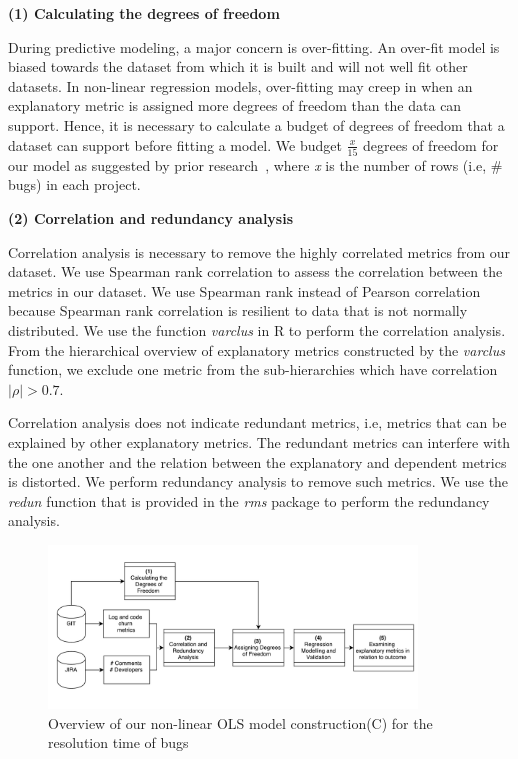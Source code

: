 

\noindent \textbf{(1) Calculating the degrees of freedom}

During predictive modeling, a major concern is over-fitting. An over-fit model is biased towards the dataset from which it is built and will not well fit other datasets. In non-linear regression models, over-fitting may creep in when an explanatory metric is assigned more degrees of freedom than the data can support. Hence, it is necessary to calculate a budget of degrees of freedom that a dataset can support before fitting a model. We budget $\frac{x}{15}$ degrees of freedom for our model as suggested by prior research~\cite{DegreesofFreedom}, where \textsl{x} is the number of rows (i.e, \# bugs) in each project. 


\noindent \textbf{(2) Correlation and redundancy analysis}

Correlation analysis is necessary to remove the highly correlated metrics from our dataset. We use Spearman rank correlation to assess the correlation between the metrics in our dataset. We use Spearman rank instead of Pearson correlation because Spearman rank correlation is resilient to data that is not normally distributed. We use the function \textsl{varclus} in R to perform the correlation analysis. From the hierarchical overview of explanatory metrics constructed by the \emph{varclus} function, we exclude one metric from the sub-hierarchies which have correlation $|\rho| > 0.7 $.

Correlation analysis does not indicate redundant metrics, i.e, metrics that can be explained by other explanatory metrics. The redundant metrics can interfere with the one another and the relation between the explanatory and dependent metrics is distorted. We perform redundancy analysis to remove such metrics. We use the \textsl{redun} function that is provided in the \textsl{rms} package to perform the redundancy analysis.

\begin{figure}
	\centering
	\includegraphics[width=9.8cm]{MethodologyOLS}
	\caption{Overview of our non-linear OLS model construction(C) for the resolution time of bugs}
	\label{fig:MethodologyOLS}
\end{figure}



